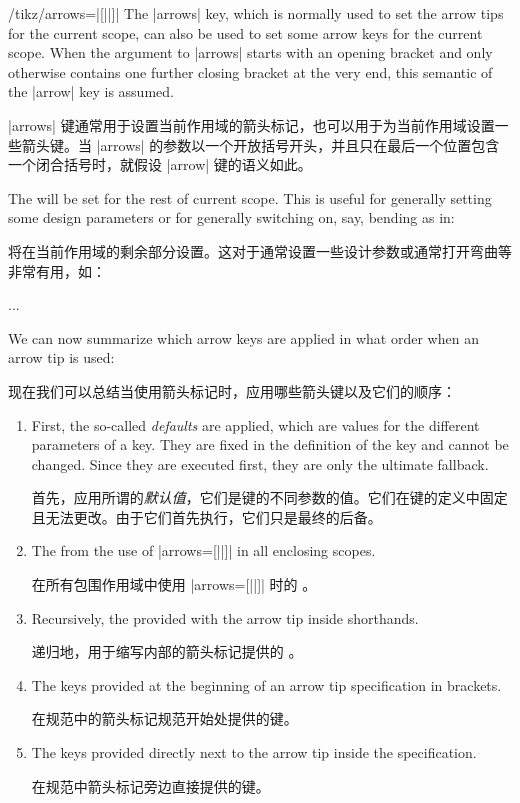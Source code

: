\begin{key}{/tikz/arrows=|[||]|}
    The |arrows| key, which is normally used to set the arrow tips for the
    current scope, can also be used to set some arrow keys for the current
    scope. When the argument to |arrows| starts with an opening bracket and
    only otherwise contains one further closing bracket at the very end, this
    semantic of the |arrow| key is assumed.

    |arrows| 键通常用于设置当前作用域的箭头标记，也可以用于为当前作用域设置一些箭头键。当 |arrows| 的参数以一个开放括号开头，并且只在最后一个位置包含一个闭合括号时，就假设 |arrow| 键的语义如此。

    The  will be set for the rest of current scope. This is
    useful for generally setting some design parameters or for generally
    switching on, say, bending as in:

     将在当前作用域的剩余部分设置。这对于通常设置一些设计参数或通常打开弯曲等非常有用，如：

\begin{codeexample}
\tikz [arrows={[bend]}] ... %
\end{codeexample}
\end{key}

We can now summarize which arrow keys are applied in what order when an arrow
tip is used:

现在我们可以总结当使用箭头标记时，应用哪些箭头键以及它们的顺序：
%
\begin{enumerate}
    \item First, the so-called \emph{defaults} are applied, which are values
        for the different parameters of a key. They are fixed in the
        definition of the key and cannot be changed. Since they are executed
        first, they are only the ultimate fallback.

        首先，应用所谓的\emph{默认值}，它们是键的不同参数的值。它们在键的定义中固定且无法更改。由于它们首先执行，它们只是最终的后备。


    \item The  from the use of |arrows=[||]| in all
        enclosing scopes.

        在所有包围作用域中使用 |arrows=[||]| 时的 。


    \item Recursively, the  provided with the arrow tip inside
        shorthands.

        递归地，用于缩写内部的箭头标记提供的 。


    \item The keys provided at the beginning of an arrow tip specification in
        brackets.

        在规范中的箭头标记规范开始处提供的键。


    \item The keys provided directly next to the arrow tip inside the
        specification.

        在规范中箭头标记旁边直接提供的键。


\end{enumerate}


